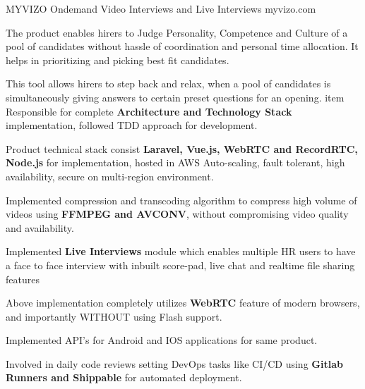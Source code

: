 

\begin{cventries}

  \cventry
    {MYVIZO} %
    {Ondemand Video Interviews and Live Interviews} %
    {myvizo.com} %
    { } %
    {
      \begin{cvitems} %
        \item {The product enables hirers to Judge Personality, Competence and Culture of a pool of candidates without hassle of coordination and personal time allocation. It helps in prioritizing and picking best fit candidates.}
        \item {This tool allows hirers to step back and relax, when a pool of candidates is simultaneously giving answers to certain preset questions for an opening.}
        item {Responsible for complete \textbf{Architecture and Technology Stack} implementation, followed TDD approach for development.}
        \item {Product technical stack consist \textbf{Laravel, Vue.js, WebRTC and RecordRTC, Node.js} for implementation, hosted in AWS Auto-scaling, fault tolerant, high availability, secure on multi-region environment.}
        \item {Implemented compression and transcoding algorithm to compress high volume of videos using \textbf{FFMPEG and AVCONV}, without compromising video quality and availability.}
        \item {Implemented \textbf{Live Interviews} module which enables multiple HR users to have a face to face interview with inbuilt score-pad, live chat and realtime file sharing features}
        \item {Above implementation completely utilizes \textbf{WebRTC} feature of modern browsers, and importantly WITHOUT using Flash support.}
        \item {Implemented API's for Android and IOS applications for same product.}
        \item {Involved in daily code reviews setting DevOps tasks like CI/CD using \textbf{Gitlab Runners and Shippable} for automated deployment.}

\end{cvitems}}
\end{cventries}
